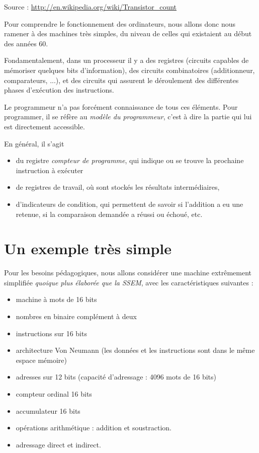 \documentclass[10pt]{article}
\begin{document}
Source : \url{http://en.wikipedia.org/wiki/Transistor_count}


Pour comprendre le fonctionnement des ordinateurs, nous allons donc nous ramener 
à des machines très simples, du niveau de celles qui existaient au début des années 60.

Fondamentalement, dans un processeur il y a des registres (circuits capables de mémoriser
quelques bits d'information), des circuits combinatoires (additionneur, comparateurs, ...),
et des circuits qui assurent le déroulement des différentes phases d'exécution des instructions.

Le programmeur n'a pas forcément connaissance de tous ces
éléments. Pour programmer, il se réfère au \emph{modèle du
  programmeur}, c'est à dire la partie qui lui est directement accessible.

En général, il s'agit
\begin{itemize}
\item du registre \emph{compteur de programme}, qui indique ou se trouve la prochaine instruction
à exécuter
\item de registres de travail, où sont stockés les résultats intermédiaires,
\item d'indicateurs de condition, qui permettent de savoir si l'addition a eu une retenue,
si la comparaison demandée a réussi ou échoué, etc.
\end{itemize}


\section{Un exemple très simple}

Pour les besoins pédagogiques, nous allons considérer une machine extrêmement simplifiée
\emph{quoique plus élaborée que la SSEM}, avec les caractéristiques suivantes :
\begin{itemize}
\item machine à mots de 16 bits
\item nombres en binaire complément à deux
\item instructions sur 16 bits
\item architecture Von Neumann (les données et les instructions sont dans le même espace mémoire)
\item adresses sur 12 bits (capacité d'adressage : 4096 mots de 16 bits)
\item compteur ordinal 16 bits
\item accumulateur 16 bits
\item opérations arithmétique : addition et soustraction.
\item adressage direct et indirect.
\end{itemize}
\end{document}

